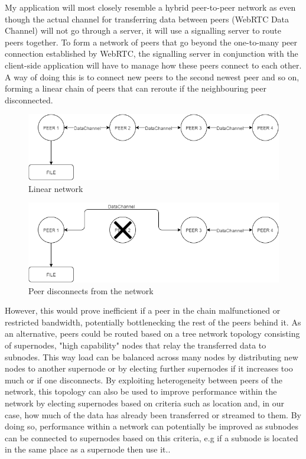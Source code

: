\documentclass[]{report}
\begin{document}
			My application will most closely resemble a hybrid peer-to-peer network as even though the actual channel for transferring data between peers (WebRTC Data Channel) will not go through a server, it will use a signalling server to route peers together. To form a network of peers that go beyond the one-to-many peer connection established by WebRTC, the signalling server in conjunction with the client-side application will have to manage how these peers connect to each other. A way of doing this is to connect new peers to the second newest peer and so on, forming a linear chain of peers that can reroute if the neighbouring peer disconnected.
			\begin{figure}[h!]
				\centering
				\caption{Linear network}
				\includegraphics[scale=0.4]{network.png}
			\end{figure}
			\begin{figure}[h!]
				\centering
				\caption{Peer disconnects from the network}
				\includegraphics[scale=0.4]{peerdisconnect.png}
			\end{figure}
			However, this would prove inefficient if a peer in the chain malfunctioned or restricted bandwidth, potentially bottlenecking the rest of the peers behind it. As an alternative, peers could be routed based on a tree network topology \cite{Tree Topology} consisting of supernodes, "high capability" nodes that relay the transferred data to subnodes. This way load can be balanced across many nodes by distributing new nodes to another supernode or by electing further supernodes if it increases too much or if one disconnects. By exploiting heterogeneity between peers of the network, this topology can also be used to improve performance within the network by electing supernodes based on criteria such as location and, in our case, how much of the data has already been transferred or streamed to them. By doing so, performance within a network can potentially be improved as subnodes can be connected to supernodes based on this criteria, e.g if a subnode is located in the same place as a supernode then use it.\cite{Supernodes}.		
\end{document}
